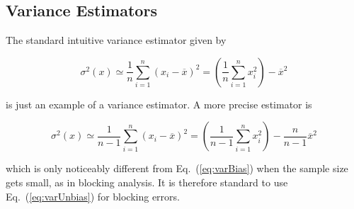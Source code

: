 \subsection{Variance Estimators}

The standard intuitive variance estimator given by

\begin{equation}
\label{eq:varBias}
 \sigma^2(x) \simeq \frac{1}{n}\sum_{i=1}^n (x_i - \overline{x})^2 = \left(\frac{1}{n}\sum_{i=1}^n x_i^2\right) - \overline{x}^2
\end{equation}

is just an example of a variance estimator. A more precise estimator is 

\begin{equation}
\label{eq:varUnbias}
 \sigma^2(x) \simeq \frac{1}{n-1}\sum_{i=1}^n (x_i - \overline{x})^2 = \left(\frac{1}{n-1}\sum_{i=1}^n x_i^2\right) - \frac{n}{n-1}\overline{x}^2
\end{equation}

which is only noticeably different from Eq.~(\ref{eq:varBias}) when the sample size gets small, as in blocking analysis. It is therefore standard to use Eq.~(\ref{eq:varUnbias}) for blocking errors.


